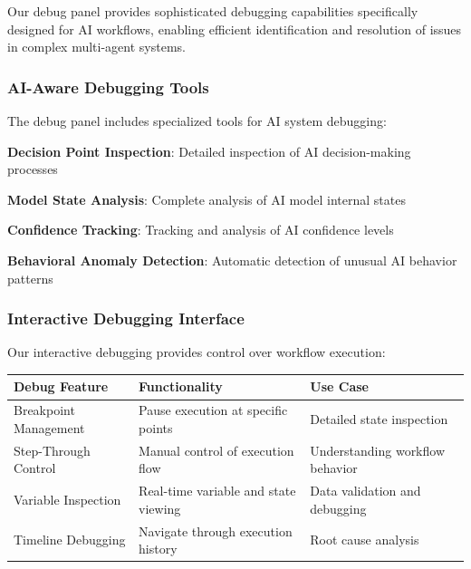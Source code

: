 Our debug panel provides sophisticated debugging capabilities specifically designed for AI workflows, enabling efficient identification and resolution of issues in complex multi-agent systems.

\subsubsection*{AI-Aware Debugging Tools}

The debug panel includes specialized tools for AI system debugging:

\begin{expandedlist}
    \item \textbf{Decision Point Inspection}: Detailed inspection of AI decision-making processes
    \item \textbf{Model State Analysis}: Complete analysis of AI model internal states
    \item \textbf{Confidence Tracking}: Tracking and analysis of AI confidence levels
    \item \textbf{Behavioral Anomaly Detection}: Automatic detection of unusual AI behavior patterns
\end{expandedlist}

\subsubsection*{Interactive Debugging Interface}

Our interactive debugging provides control over workflow execution:

\begin{center}
\begin{tabular}{@{}lll@{}}
\toprule
\textbf{Debug Feature} & \textbf{Functionality} & \textbf{Use Case} \\
\midrule
Breakpoint Management & Pause execution at specific points & Detailed state inspection \\
Step-Through Control & Manual control of execution flow & Understanding workflow behavior \\
Variable Inspection & Real-time variable and state viewing & Data validation and debugging \\
Timeline Debugging & Navigate through execution history & Root cause analysis \\
\bottomrule
\end{tabular}
\end{center}

